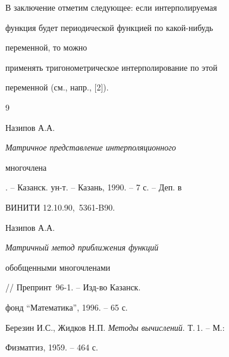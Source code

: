 




В заключение отметим следующее: если интерполируемая


функция будет периодической функцией по какой-нибудь


переменной,  то можно


применять тригонометрическое интерполирование по этой


переменной (см., напр., [2]).





\begin{thebibliography}{9}







Назипов А.А. {\em Матричное представление интерполяционного


многочлена}. -- Казанск. ун-т. -- Казань, 1990. -- 7 с. -- Деп. в


ВИНИТИ 12.10.90, \No\,5361-B90.




Назипов А.А. {\em Матричный метод приближения функций


обобщенными многочленами} // Препринт \No\,96-1. -- Изд-во Казанск.


фонд ``Математика'', 1996. -- 65 с.




Березин И.С., Жидков Н.П. {\em Методы вычислений}. Т.\,1.  -- М.:


Физматгиз, 1959. -- 464 с.





\end{thebibliography}





\vskip 1cm














\label{end}





